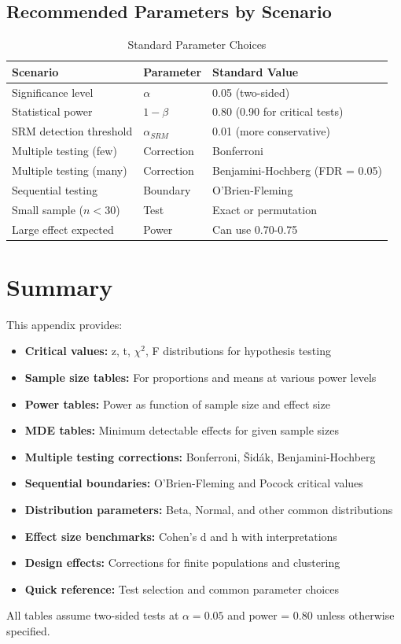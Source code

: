 \subsection{Recommended Parameters by Scenario}

\begin{table}[h]
\centering
\caption{Standard Parameter Choices}
\begin{tabular}{p{4cm}p{3cm}p{6cm}}
\toprule
\textbf{Scenario} & \textbf{Parameter} & \textbf{Standard Value} \\
\midrule
Significance level & $\alpha$ & 0.05 (two-sided) \\
Statistical power & $1 - \beta$ & 0.80 (0.90 for critical tests) \\
SRM detection threshold & $\alpha_{SRM}$ & 0.01 (more conservative) \\
Multiple testing (few) & Correction & Bonferroni \\
Multiple testing (many) & Correction & Benjamini-Hochberg (FDR = 0.05) \\
Sequential testing & Boundary & O'Brien-Fleming \\
Small sample ($n < 30$) & Test & Exact or permutation \\
Large effect expected & Power & Can use 0.70-0.75 \\
\bottomrule
\end{tabular}
\end{table}

\section{Summary}

This appendix provides:

\begin{itemize}
    \item \textbf{Critical values:} z, t, $\chi^2$, F distributions for hypothesis testing
    \item \textbf{Sample size tables:} For proportions and means at various power levels
    \item \textbf{Power tables:} Power as function of sample size and effect size
    \item \textbf{MDE tables:} Minimum detectable effects for given sample sizes
    \item \textbf{Multiple testing corrections:} Bonferroni, Šidák, Benjamini-Hochberg
    \item \textbf{Sequential boundaries:} O'Brien-Fleming and Pocock critical values
    \item \textbf{Distribution parameters:} Beta, Normal, and other common distributions
    \item \textbf{Effect size benchmarks:} Cohen's d and h with interpretations
    \item \textbf{Design effects:} Corrections for finite populations and clustering
    \item \textbf{Quick reference:} Test selection and common parameter choices
\end{itemize}

All tables assume two-sided tests at $\alpha = 0.05$ and power = 0.80 unless otherwise specified.
